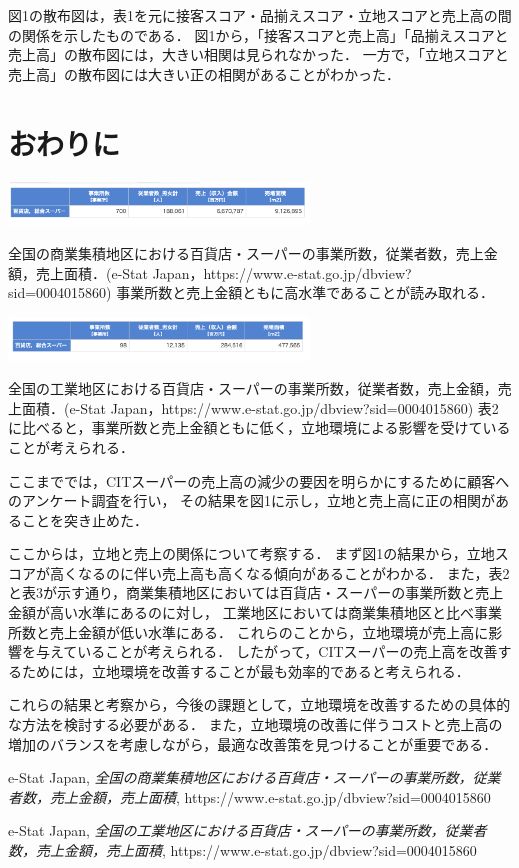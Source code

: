 \documentclass[uplatex]{jsarticle}
\begin{document}
\indent
図1の散布図は，表1を元に接客スコア・品揃えスコア・立地スコアと売上高の間の関係を示したものである．
図1から，「接客スコアと売上高」「品揃えスコアと売上高」の散布図には，大きい相関は見られなかった．
一方で，「立地スコアと売上高」の散布図には大きい正の相関があることがわかった．

\section{おわりに}

\begin{table}[htb]
\centering
\includegraphics[width=8cm]{./Figs/syougyou.png}
\caption{全国の商業集積地区における百貨店・スーパーの事業所数，従業者数，売上金額，売上面積．(e-Stat Japan，https://www.e-stat.go.jp/dbview?sid=0004015860)
事業所数と売上金額ともに高水準であることが読み取れる．}
\label{table:2}
\includegraphics[width=8cm]{./Figs/kougyou.png}
\caption{全国の工業地区における百貨店・スーパーの事業所数，従業者数，売上金額，売上面積．(e-Stat Japan，https://www.e-stat.go.jp/dbview?sid=0004015860)
表2に比べると，事業所数と売上金額ともに低く，立地環境による影響を受けていることが考えられる．}
\label{table:3}
\end{table}

ここまででは，CITスーパーの売上高の減少の要因を明らかにするために顧客へのアンケート調査を行い，
その結果を図1に示し，立地と売上高に正の相関があることを突き止めた．

\indent
ここからは，立地と売上の関係について考察する．
まず図1の結果から，立地スコアが高くなるのに伴い売上高も高くなる傾向があることがわかる．
また，表2と表3が示す通り，商業集積地区においては百貨店・スーパーの事業所数と売上金額が高い水準にあるのに対し，
工業地区においては商業集積地区と比べ事業所数と売上金額が低い水準にある．
これらのことから，立地環境が売上高に影響を与えていることが考えられる．
したがって，CITスーパーの売上高を改善するためには，立地環境を改善することが最も効率的であると考えられる．

\indent
これらの結果と考察から，今後の課題として，立地環境を改善するための具体的な方法を検討する必要がある．
また，立地環境の改善に伴うコストと売上高の増加のバランスを考慮しながら，最適な改善策を見つけることが重要である．

\begin{thebibliography}{9}
\item e-Stat Japan, \textit{全国の商業集積地区における百貨店・スーパーの事業所数，従業者数，売上金額，売上面積}, https://www.e-stat.go.jp/dbview?sid=0004015860
\item e-Stat Japan, \textit{全国の工業地区における百貨店・スーパーの事業所数，従業者数，売上金額，売上面積}, https://www.e-stat.go.jp/dbview?sid=0004015860
\end{thebibliography}
\end{document}

